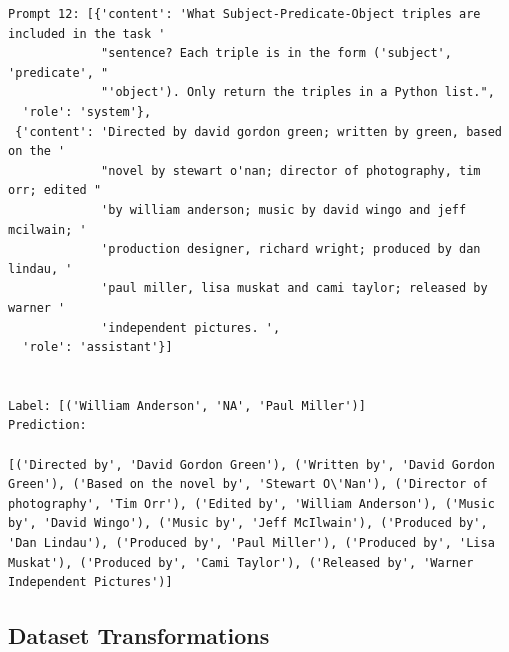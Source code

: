 \documentclass{article}
\begin{document}
\begin{lstlisting}
Prompt 12: [{'content': 'What Subject-Predicate-Object triples are included in the task '
             "sentence? Each triple is in the form ('subject', 'predicate', "
             "'object'). Only return the triples in a Python list.",
  'role': 'system'},
 {'content': 'Directed by david gordon green; written by green, based on the '
             "novel by stewart o'nan; director of photography, tim orr; edited "
             'by william anderson; music by david wingo and jeff mcilwain; '
             'production designer, richard wright; produced by dan lindau, '
             'paul miller, lisa muskat and cami taylor; released by warner '
             'independent pictures. ',
  'role': 'assistant'}]


Label: [('William Anderson', 'NA', 'Paul Miller')]
Prediction:

[('Directed by', 'David Gordon Green'), ('Written by', 'David Gordon Green'), ('Based on the novel by', 'Stewart O\'Nan'), ('Director of photography', 'Tim Orr'), ('Edited by', 'William Anderson'), ('Music by', 'David Wingo'), ('Music by', 'Jeff McIlwain'), ('Produced by', 'Dan Lindau'), ('Produced by', 'Paul Miller'), ('Produced by', 'Lisa Muskat'), ('Produced by', 'Cami Taylor'), ('Released by', 'Warner Independent Pictures')]
\end{lstlisting}
\subsection{Dataset Transformations}\label{dataset_transform}
\end{document}
